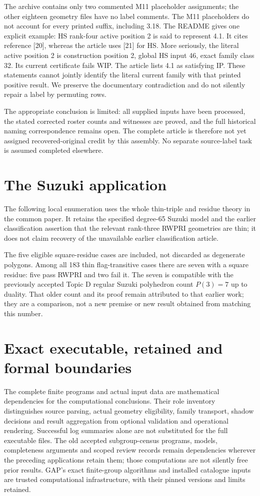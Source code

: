 \documentclass[11pt,a4paper]{article}
\begin{document}
The archive contains only two commented M11 placeholder assignments;
the other eighteen geometry files have no label comments. The M11
placeholders do not account for every printed suffix, including 3.18.
The README gives one explicit example: HS rank-four active position 2
is said to represent 4.1. It cites reference [20], whereas the article
uses [21] for HS. More seriously, the literal active position 2 is
construction position 2, global HS input 46, exact family class 32.
Its current certificate fails WIP. The article lists 4.1 as satisfying
IP. These statements cannot jointly identify the literal current
family with that printed positive result. We preserve the documentary
contradiction and do not silently repair a label by permuting rows.

The appropriate conclusion is limited: all supplied inputs have been
processed, the stated corrected roster counts and witnesses are proved,
and the full historical naming correspondence remains open. The
complete article is therefore not yet assigned recovered-original
credit by this assembly. No separate source-label task is assumed
completed elsewhere.

\section{The Suzuki application}
The following local enumeration uses the whole thin-triple and residue
theory in the common paper. It retains the specified degree-65 Suzuki
model and the earlier classification assertion that the relevant
rank-three RWPRI geometries are thin; it does not claim recovery of
the unavailable earlier classification article.

The five eligible square-residue cases are included, not discarded as
degenerate polygons. Among all 183 thin flag-transitive cases there are
seven with a square residue: five pass RWPRI and two fail it. The seven
is compatible with the previously accepted Topic D regular Suzuki
polyhedron count $P(3)=7$ up to duality. That older count and its proof
remain attributed to that earlier work; they are a comparison, not a
new premise or new result obtained from matching this number.



\section{Exact executable, retained and formal boundaries}
The complete finite programs and actual input data are mathematical
dependencies for the computational conclusions. Their role inventory
distinguishes source parsing, actual geometry eligibility, family
transport, shadow decisions and result aggregation from optional
validation and operational rendering. Successful log summaries alone
are not substituted for the full executable files. The old accepted
subgroup-census programs, models, completeness arguments and scoped
review records remain dependencies wherever the preceding applications
retain them; those computations are not silently free prior results.
GAP's exact finite-group algorithms and installed catalogue inputs are
trusted computational infrastructure, with their pinned versions and
limits retained.
\end{document}
